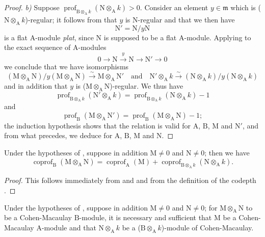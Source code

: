 \begin{proof}
\emph{b)} Suppose $\operatorname{prof}_{\mathrm{B}\otimes_\mathrm{A} k}(\mathrm{N}\otimes_\mathrm{A} k)>0$.
Consider an element $y\in\mathfrak{m}$ which is ($\mathrm{N}\otimes_\mathrm{A} k$)-regular; it follows from  that $y$ is N-regular and that we then have
\[
  \mathrm{N}'=\mathrm{N}/y\mathrm{N}
\]
is a flat $\mathrm{A}$-module \emph{plat}, since $\mathrm{N}$ is supposed to be a flat $\mathrm{A}$-module.
Applying  to the exact sequence of $\mathrm{A}$-modules
\[
  0\to\mathrm{N}\xrightarrow{y}\mathrm{N}\to\mathrm{N}'\to 0
\]
we conclude that we have isomorphisms
\[
  (\mathrm{M}\otimes_\mathrm{A}\mathrm{N})/y(\mathrm{M}\otimes_\mathrm{A}\mathrm{N})\xrightarrow{\sim}\mathrm{M}\otimes_\mathrm{A}\mathrm{N}' \quad\text{and}\quad \mathrm{N}'\otimes_\mathrm{A} k\xrightarrow{\sim}(\mathrm{N}\otimes_\mathrm{A} k)/y(\mathrm{N}\otimes_\mathrm{A} k)
\]
and in addition that $y$ is ($\mathrm{M}\otimes_\mathrm{A}\mathrm{N}$)-regular.
We thus have
\[
  \operatorname{prof}_{\mathrm{B}\otimes_\mathrm{A} k}(\mathrm{N}'\otimes_\mathrm{A} k)=\operatorname{prof}_{\mathrm{B}\otimes_\mathrm{A} k}(\mathrm{N}\otimes_\mathrm{A} k)-1
\]
and
\[
  \operatorname{prof}_\mathrm{B}(\mathrm{M}\otimes_\mathrm{A}\mathrm{N}')=\operatorname{prof}_\mathrm{B}(\mathrm{M}\otimes_\mathrm{A}\mathrm{N})-1;
\]
the induction hypothesis shows that the relation  is valid for $\mathrm{A}$, $\mathrm{B}$, $\mathrm{M}$ and $\mathrm{N}'$, and from what precedes, we deduce  for $\mathrm{A}$, $\mathrm{B}$, $\mathrm{M}$ and $\mathrm{N}$.
\end{proof}

\begin{corollary}[6.3.2]
\label{IV.6.3.2}
Under the hypotheses of , suppose in addition $\mathrm{M}\neq 0$ and $\mathrm{N}\neq 0$; then we have
\begin{equation}
  \operatorname{coprof}_\mathrm{B}(\mathrm{M}\otimes_\mathrm{A}\mathrm{N})=\operatorname{coprof}_\mathrm{A}(\mathrm{M})+\operatorname{coprof}_{\mathrm{B}\otimes_\mathrm{A} k}(\mathrm{N}\otimes_\mathrm{A} k).
  \tag{6.3.2.1}
\end{equation}
\end{corollary}

\begin{proof}
This follows immediately from  and  and from the definition of the codepth .
\end{proof}

\begin{corollary}[6.3.3]
\label{IV.6.3.3}
Under the hypotheses of , suppose in addition $\mathrm{M}\neq 0$ and $\mathrm{N}\neq 0$; for $\mathrm{M}\otimes_\mathrm{A}\mathrm{N}$ to be a Cohen-Macaulay $\mathrm{B}$-module, it is necessary and sufficient that $\mathrm{M}$ be a Cohen-Macaulay $\mathrm{A}$-module and that $\mathrm{N}\otimes_\mathrm{A} k$ be a ($\mathrm{B}\otimes_\mathrm{A} k$)-module of Cohen-Macaulay.
\end{corollary}

